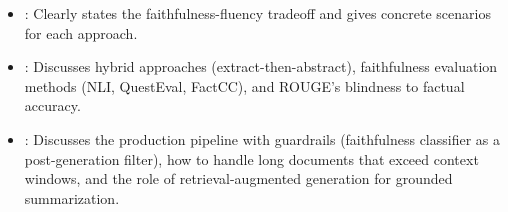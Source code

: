 \begin{interviewq}

\goodgreat
\begin{itemize}
    \item {}: Clearly states the faithfulness-fluency tradeoff and gives
    concrete scenarios for each approach.
    \item {}: Discusses hybrid approaches (extract-then-abstract), faithfulness
    evaluation methods (NLI, QuestEval, FactCC), and ROUGE's blindness to factual accuracy.
    \item {}: Discusses the production pipeline with guardrails (faithfulness
    classifier as a post-generation filter), how to handle long documents that exceed context
    windows, and the role of retrieval-augmented generation for grounded summarization.
\end{itemize}

\end{interviewq}

\vspace{0.5em}


